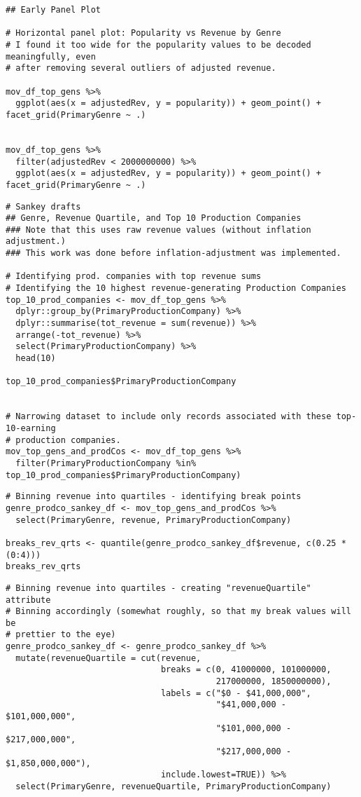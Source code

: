 \begin{lstlisting}
## Early Panel Plot

# Horizontal panel plot: Popularity vs Revenue by Genre
# I found it too wide for the popularity values to be decoded meaningfully, even
# after removing several outliers of adjusted revenue. 

mov_df_top_gens %>%
  ggplot(aes(x = adjustedRev, y = popularity)) + geom_point() + facet_grid(PrimaryGenre ~ .)


mov_df_top_gens %>%
  filter(adjustedRev < 2000000000) %>%
  ggplot(aes(x = adjustedRev, y = popularity)) + geom_point() + facet_grid(PrimaryGenre ~ .)
\end{lstlisting}

\begin{lstlisting}
# Sankey drafts
## Genre, Revenue Quartile, and Top 10 Production Companies
### Note that this uses raw revenue values (without inflation adjustment.)
### This work was done before inflation-adjustment was implemented.

# Identifying prod. companies with top revenue sums
# Identifying the 10 highest revenue-generating Production Companies
top_10_prod_companies <- mov_df_top_gens %>%
  dplyr::group_by(PrimaryProductionCompany) %>%
  dplyr::summarise(tot_revenue = sum(revenue)) %>%
  arrange(-tot_revenue) %>%
  select(PrimaryProductionCompany) %>%
  head(10)

top_10_prod_companies$PrimaryProductionCompany


# Narrowing dataset to include only records associated with these top-10-earning
# production companies.
mov_top_gens_and_prodCos <- mov_df_top_gens %>%
  filter(PrimaryProductionCompany %in% top_10_prod_companies$PrimaryProductionCompany)
\end{lstlisting}

\begin{lstlisting}
# Binning revenue into quartiles - identifying break points
genre_prodco_sankey_df <- mov_top_gens_and_prodCos %>%
  select(PrimaryGenre, revenue, PrimaryProductionCompany)

breaks_rev_qrts <- quantile(genre_prodco_sankey_df$revenue, c(0.25 * (0:4)))
breaks_rev_qrts
\end{lstlisting}

\begin{lstlisting}
# Binning revenue into quartiles - creating "revenueQuartile" attribute
# Binning accordingly (somewhat roughly, so that my break values will be 
# prettier to the eye)
genre_prodco_sankey_df <- genre_prodco_sankey_df %>%
  mutate(revenueQuartile = cut(revenue,
                               breaks = c(0, 41000000, 101000000, 
                                          217000000, 1850000000),
                               labels = c("$0 - $41,000,000",
                                          "$41,000,000 - $101,000,000",
                                          "$101,000,000 - $217,000,000",
                                          "$217,000,000 - $1,850,000,000"),
                               include.lowest=TRUE)) %>%
  select(PrimaryGenre, revenueQuartile, PrimaryProductionCompany)
\end{lstlisting}

